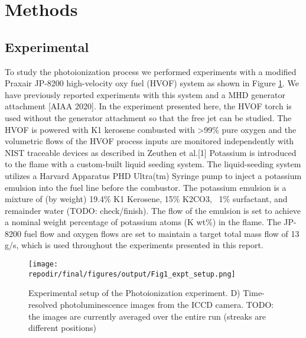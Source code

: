 \section{Methods}


\subsection{Experimental}

To study the photoionization process we performed experiments with a modified Praxair JP-8200 high-velocity oxy fuel (HVOF) system as shown in Figure \ref{fig:expt_setup}. We have previously reported experiments with this system and a MHD generator attachment [AIAA 2020]. In the experiment presented here, the HVOF torch is used without the generator attachment so that the free jet can be studied.  The HVOF is powered with K1 kerosene combusted with >99\% pure oxygen and the volumetric flows of the HVOF process inputs are monitored independently with NIST traceable devices as described in Zeuthen et al.[1] Potassium is introduced to the flame with a custom-built liquid seeding system. The liquid-seeding system utilizes a Harvard Apparatus PHD Ultra(tm) Syringe pump to inject a potassium emulsion into the fuel line before the combustor. The potassium emulsion is a mixture of (by weight) 19.4\% K1 Kerosene, 15\% K2CO3,  ~1\% surfactant, and remainder water (TODO: check/finish). The flow of the emulsion is set to achieve a nominal weight percentage of potassium atoms (K wt\%) in the flame. The JP-8200 fuel flow and oxygen flows are set to maintain a target total mass flow of 13 g/s, which is used throughout the experiments presented in this report.
\begin{figure}[h]
    \texttt{[image: \\repodir/final/figures/output/Fig1\_expt\_setup.png]} 
    \caption{Experimental setup of the Photoionization experiment. D) Time-resolved photoluminescence images from the ICCD camera. TODO: the images are currently averaged over the entire run (streaks are different positions) }
    \label{fig:expt_setup}
\end{figure}

